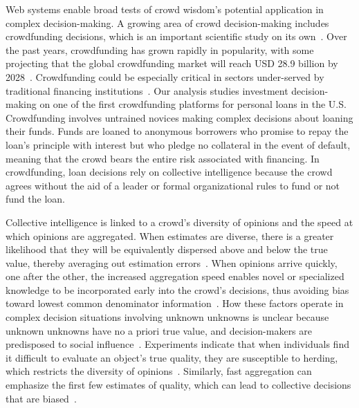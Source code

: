 \documentclass[sigconf]{acmart}
\begin{document}
Web systems enable broad tests of crowd wisdom’s potential application in complex decision-making. A growing area of crowd decision-making includes crowdfunding decisions, which is an important scientific study on its own~\cite{mollick2014dynamics,sorenson2016expand,gerber2013crowdfunding}. Over the past years, crowdfunding has grown rapidly in popularity, with some projecting that the global crowdfunding market will reach USD 28.9 billion by 2028~\cite{marketgrowth}. Crowdfunding could be especially critical in sectors under-served by traditional financing institutions~\cite{makina2019potential,arvila2020enabling}. Our analysis studies investment decision-making on one of the first crowdfunding platforms for personal loans in the U.S. Crowdfunding involves untrained novices making complex decisions about loaning their funds. Funds are loaned to anonymous borrowers who promise to repay the loan's principle with interest but who pledge no collateral in the event of default, meaning that the crowd bears the entire risk associated with financing. In crowdfunding, loan decisions rely on collective intelligence because the crowd agrees without the aid of a leader or formal organizational rules to fund or not fund the loan.

Collective intelligence is linked to a crowd’s diversity of opinions and the speed at which opinions are aggregated. When estimates are diverse, there is a greater likelihood that they will be equivalently dispersed above and below the true value, thereby averaging out estimation errors~\cite{Hong2004,Page2007}. When opinions arrive quickly, one after the other, the increased aggregation speed enables novel or specialized knowledge to be incorporated early into the crowd’s decisions, thus avoiding bias toward lowest common denominator information~\cite{surowiecki2005wisdom,lyon2013wisdom,prelec2017solution}. How these factors operate in complex decision situations involving unknown unknowns is unclear because unknown unknowns have no a priori true value, and decision-makers are predisposed to social influence~\cite{cialdini2006influence}. Experiments indicate that when individuals find it difficult to evaluate an object's true quality, they are susceptible to herding, which restricts the diversity of opinions~\cite{Salganik2006}. Similarly, fast aggregation can emphasize the first few estimates of quality, which can lead to collective decisions that are biased~\cite{Muchnik2013,Bikhchandani1992,Easley2010}.
\end{document}
